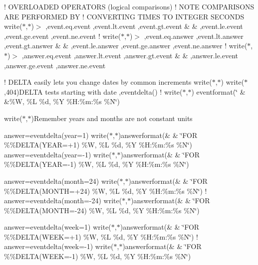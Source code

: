 ! O\+V\+E\+R\+L\+O\+A\+D\+ED O\+P\+E\+R\+A\+T\+O\+RS (logical comparisons) ! N\+O\+TE C\+O\+M\+P\+A\+R\+I\+S\+O\+NS A\+RE P\+E\+R\+F\+O\+R\+M\+ED BY ! C\+O\+N\+V\+E\+R\+T\+I\+NG T\+I\+M\+ES TO I\+N\+T\+E\+G\+ER S\+E\+C\+O\+N\+DS write($\ast$,$\ast$)\textquotesingle{}$>$ \textquotesingle{},event.\+eq.\+event ,event.\+lt.\+event ,event.\+gt.\+event \& \& ,event.\+le.\+event ,event.\+ge.\+event ,event.\+ne.\+event ! write($\ast$,$\ast$)\textquotesingle{}$>$ \textquotesingle{},event.\+eq.\+answer ,event.\+lt.\+answer ,event.\+gt.\+answer \& \& ,event.\+le.\+answer ,event.\+ge.\+answer ,event.\+ne.\+answer ! write($\ast$,$\ast$)\textquotesingle{}$>$ \textquotesingle{},answer.\+eq.\+event ,answer.\+lt.\+event ,answer.\+gt.\+event \& \& ,answer.\+le.\+event ,answer.\+ge.\+event ,answer.\+ne.\+event

! D\+E\+L\+TA easily lets you change dates by common increments write($\ast$,$\ast$) write($\ast$,404)\textquotesingle{}D\+E\+L\+TA tests starting with date \textquotesingle{},eventdelta() ! write($\ast$,$\ast$) eventformat(\char`\"{}                             \&
        \&\%\+W, \%\+L \%d, \%\+Y \%\+H\+:\%m\+:\%s \%\+N\char`\"{})

write($\ast$,$\ast$)\textquotesingle{}Remember years and months are not constant units\textquotesingle{}

answer=eventdelta(year=1) write($\ast$,$\ast$)answerformat(\& \& \char`\"{}\+F\+O\+R \%\%\+D\+E\+L\+T\+A(\+Y\+E\+A\+R=+1)            \%\+W, \%\+L \%d, \%\+Y \%\+H\+:\%m\+:\%s \%\+N\char`\"{}) answer=eventdelta(year=-\/1) write($\ast$,$\ast$)answerformat(\& \& \char`\"{}\+F\+O\+R \%\%\+D\+E\+L\+T\+A(\+Y\+E\+A\+R=-\/1)            \%\+W, \%\+L \%d, \%\+Y \%\+H\+:\%m\+:\%s \%\+N\char`\"{})

answer=eventdelta(month=24) write($\ast$,$\ast$)answerformat(\& \& \char`\"{}\+F\+O\+R \%\%\+D\+E\+L\+T\+A(\+M\+O\+N\+T\+H=+24)          \%\+W, \%\+L \%d, \%\+Y \%\+H\+:\%m\+:\%s \%\+N\char`\"{}) ! answer=eventdelta(month=-\/24) write($\ast$,$\ast$)answerformat(\& \& \char`\"{}\+F\+O\+R \%\%\+D\+E\+L\+T\+A(\+M\+O\+N\+T\+H=-\/24)          \%\+W, \%\+L \%d, \%\+Y \%\+H\+:\%m\+:\%s \%\+N\char`\"{})

answer=eventdelta(week=1) write($\ast$,$\ast$)answerformat(\& \& \char`\"{}\+F\+O\+R \%\%\+D\+E\+L\+T\+A(\+W\+E\+E\+K=+1)            \%\+W, \%\+L \%d, \%\+Y \%\+H\+:\%m\+:\%s \%\+N\char`\"{}) ! answer=eventdelta(week=-\/1) write($\ast$,$\ast$)answerformat(\& \& \char`\"{}\+F\+O\+R \%\%\+D\+E\+L\+T\+A(\+W\+E\+E\+K=-\/1)            \%\+W, \%\+L \%d, \%\+Y \%\+H\+:\%m\+:\%s \%\+N\char`\"{})


